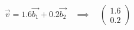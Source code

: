 \documentclass[preview]{standalone}
\begin{document}
\begin{align*}
\vec{v} = 1.6\vec{b_1} + 0.2\vec{b_2} \quad \implies \quad \begin{pmatrix} 1.6 \\ 0.2 \end{pmatrix}
\end{align*}
\end{document}
